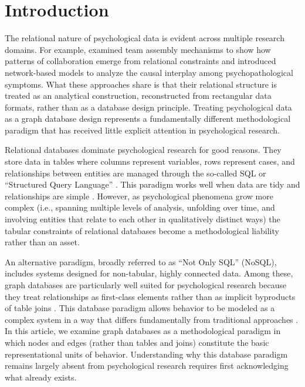 \documentclass[sn-apa,pdflatex]{sn-jnl}
\theoremstyle{remark}
\theoremstyle{definition}
\begin{document}



\maketitle

\section{Introduction}\label{sec1}

The relational nature of psychological data is evident across multiple
research domains. For example, \citet{guimera2005} examined team
assembly mechanisms to show how patterns of collaboration emerge from
relational constraints and \citet{borsboom2013} introduced network-based
models to analyze the causal interplay among psychopathological
symptoms. What these approaches share is that their relational structure
is treated as an analytical construction, reconstructed from rectangular
data formats, rather than as a database design principle. Treating
psychological data as a graph database design represents a fundamentally
different methodological paradigm that has received little explicit
attention in psychological research.

Relational databases dominate psychological research for good reasons.
They store data in tables where columns represent variables, rows
represent cases, and relationships between entities are managed through
the so-called SQL or ``Structured Query Language'' \citep{soto2025}.
This paradigm works well when data are tidy and relationships are simple
\citep{Wickham2023}. However, as psychological phenomena grow more
complex (i.e., spanning multiple levels of analysis, unfolding over
time, and involving entities that relate to each other in qualitatively
distinct ways) the tabular constraints of relational databases become a
methodological liability rather than an asset.

An alternative paradigm, broadly referred to as ``Not Only SQL''
(NoSQL), includes systems designed for non-tabular, highly connected
data. Among these, graph databases are particularly well suited for
psychological research because they treat relationships as first-class
elements rather than as implicit byproducts of table joins
\citep{Robinson2015}. This database paradigm allows behavior to be
modeled as a complex system in a way that differs fundamentally from
traditional approaches \citep{Guastello2009}. In this article, we
examine graph databases as a methodological paradigm in which nodes and
edges (rather than tables and joins) constitute the basic
representational units of behavior. Understanding why this database
paradigm remains largely absent from psychological research requires
first acknowledging what already exists.
\end{document}
